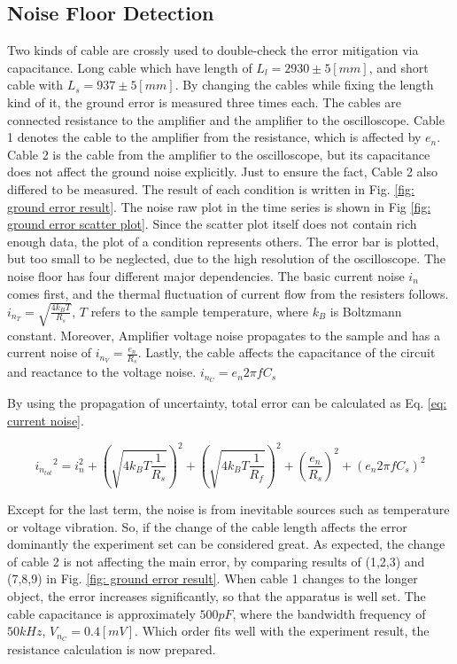 \documentclass{article}
\begin{document}
\subsection{Noise Floor Detection}
Two kinds of cable are crossly used to double-check the error mitigation via capacitance.
Long cable which have length of $L_l = 2930 \pm 5 [mm]$, and short cable with $L_s = 937 \pm 5 [mm]$.
By changing the cables while fixing the length kind of it, the ground error is measured three times each.
The cables are connected resistance to the amplifier and the amplifier to the oscilloscope.
Cable 1 denotes the cable to the amplifier from the resistance, which is affected by $e_n$.
Cable 2 is the cable from the amplifier to the oscilloscope, but its capacitance does not affect the ground noise explicitly.
Just to ensure the fact, Cable 2 also differed to be measured.
The result of each condition is written in Fig. \ref{fig: ground error result}.
The noise raw plot in the time series is shown in Fig \ref{fig: ground error scatter plot}.
Since the scatter plot itself does not contain rich enough data, the plot of a condition represents others.
The error bar is plotted, but too small to be neglected, due to the high resolution of the oscilloscope.
The noise floor has four different major dependencies.
The basic current noise $i_n$ comes first, and the thermal fluctuation of current flow from the resisters follows.
$i_{n_T} = \sqrt{\frac{4k_B T}{R_s}}$, $T$ refers to the sample temperature, where $k_B$ is Boltzmann constant.
Moreover, Amplifier voltage noise propagates to the sample and has a current noise of $i_{n_V}=\frac{e_n}{R_s}$.
Lastly, the cable affects the capacitance of the circuit and reactance to the voltage noise.
$i_{n_C} = e_n 2 \pi f C_s$

By using the propagation of uncertainty, total error can be calculated as Eq. \ref{eq: current noise}.

\begin{equation}
    {i_{n_{tot}}}^2 =  i_n^2 + \left(\sqrt{4k_B T \frac{1}{R_s}}\right)^2 + \left( \sqrt{4 k_B T \frac{1}{R_f}}\right)^2 + \left( \frac{e_n}{R_s}\right)^2 + \left( e_n 2\pi f C_s \right)^2
    \label{eq: current noise}
\end{equation}

Except for the last term, the noise is from inevitable sources such as temperature or voltage vibration.
So, if the change of the cable length affects the error dominantly the experiment set can be considered great.
As expected, the change of cable 2 is not affecting the main error, by comparing results of (1,2,3) and (7,8,9) in Fig. \ref{fig: ground error result}.
When cable 1 changes to the longer object, the error increases significantly, so that the apparatus is well set.
The cable capacitance is approximately $500 pF$, where the bandwidth frequency of $50 kHz$,
$V_{n_C} = 0.4 [mV]$. Which order fits well with the experiment result, the resistance calculation is now prepared.
\end{document}
